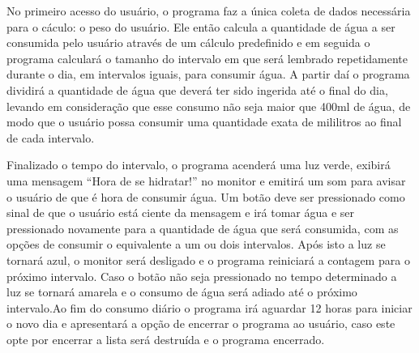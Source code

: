 \documentclass[a4paper]{article}
\begin{document}
No primeiro acesso do usuário, o programa faz a única coleta de dados necessária para o cáculo: o peso do usuário. Ele então calcula a quantidade de água a ser consumida pelo usuário através de um cálculo predefinido e em seguida o programa calculará o tamanho do intervalo em que será lembrado repetidamente durante o dia, em intervalos iguais, para consumir água. A partir daí o programa dividirá a quantidade de água que deverá ter sido ingerida até o final do dia, levando em consideração que esse consumo não seja maior que 400ml de água, de modo que o usuário possa consumir uma quantidade exata de mililitros ao final de cada intervalo.


Finalizado o tempo do intervalo, o programa acenderá uma luz verde, exibirá uma mensagem “Hora de se hidratar!” no monitor e emitirá um som para avisar o usuário de que é hora de consumir água. Um botão deve ser pressionado como sinal de que o usuário está ciente da mensagem e irá tomar água e ser pressionado novamente para a quantidade de água que será consumida, com as opções de consumir o equivalente a um ou dois intervalos. Após isto a luz se tornará azul, o monitor será desligado e o programa reiniciará a contagem para o próximo intervalo. Caso o botão não seja pressionado no tempo determinado a luz se tornará amarela e o consumo de água será adiado até o próximo intervalo.Ao fim do consumo diário o programa irá aguardar 12 horas para iniciar o novo dia e apresentará a opção de encerrar o programa ao usuário, caso este opte por encerrar a lista será destruída e o programa encerrado.
\end{document}
